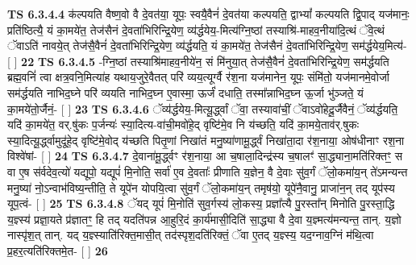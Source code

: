 \documentclass[17pt]{extarticle}
\begin{document}
                  \newline
                                \textbf{ TS 6.3.4.4} \newline
                  क॑ल्पयति वैष्ण॒वो वै दे॒वत॑या॒ यूपः॒ स्वयै॒वैनं॑ दे॒वत॑या कल्पयति॒ द्वाभ्यां᳚ कल्पयति द्वि॒पाद् यज॑मानः॒ प्रति॑ष्ठित्यै॒ यं का॒मये॑त॒ तेज॑सैनं दे॒वता॑भिरिन्द्रि॒येण॒ व्य॑र्द्धयेय॒-मित्य॑ग्नि॒ष्ठां तस्याश्रि॑-माहव॒नीया॑दि॒त्थं ॅवे॒त्थं ॅवाऽति॑ नावये॒त् तेज॑सै॒वैनं॑ दे॒वता॑भिरिन्द्रि॒येण॒ व्य॑र्द्धयति॒ यं का॒मये॑त॒ तेज॑सैनं दे॒वता॑भिरिन्द्रि॒येण॒ सम॑र्द्धयेय॒मित्य॑- [  ] \textbf{  22} \newline
                  \newline
                                \textbf{ TS 6.3.4.5} \newline
                  -ग्नि॒ष्ठां तस्याश्रि॑माहव॒नीये॑न॒ सं मि॑नुया॒त् तेज॑सै॒वैनं॑ दे॒वता॑भिरिन्द्रि॒येण॒ सम॑र्द्धयति ब्रह्म॒वनिं॑ त्वा क्षत्र॒वनि॒मित्या॑ह यथाय॒जुरे॒वैतत् परि॑ व्यय॒त्यूर्ग्वै र॑श॒ना यज॑मानेन॒ यूपः॒ संमि॑तो॒ यज॑मानमे॒वोर्जा सम॑र्द्धयति नाभिद॒घ्ने परि॑ व्ययति नाभिद॒घ्न ए॒वास्मा॒ ऊर्जं॑ दधाति॒ तस्मा᳚न्नाभिद॒घ्न ऊ॒र्जा भु॑ञ्जते॒ यं का॒मये॑तो॒र्जैनं॒- [  ] \textbf{  23} \newline
                  \newline
                                \textbf{ TS 6.3.4.6} \newline
                  ॅव्य॑र्द्धयेय॒-मित्यू॒र्द्ध्वां ॅवा॒ तस्यावा॑चीं॒ ॅवाऽवो॑हेदू॒र्जैवैनं॒ ॅव्य॑र्द्धयति॒ यदि॑ का॒मये॑त॒ वर्.षु॑कः प॒र्जन्यः॑ स्या॒दित्य-वा॑ची॒मवो॑हे॒द् वृष्टि॑मे॒व नि य॑च्छति॒ यदि॑ का॒मये॒ताव॑र्.षुकः स्या॒दित्यू॒र्द्ध्वामुदू॑हे॒द् वृष्टि॑मे॒वोद् य॑च्छति पितृ॒णां निखा॑तं मनु॒ष्या॑णामू॒र्द्ध्वं निखा॑ता॒दा र॑श॒नाया॒ ओष॑धीनाꣳ रश॒ना विश्वे॑षां- [  ] \textbf{  24} \newline
                  \newline
                                \textbf{ TS 6.3.4.7} \newline
                  दे॒वाना॑मू॒र्द्ध्वꣳ र॑श॒नाया॒ आ च॒षाला॒दिन्द्र॑स्य च॒षालꣳ॑ सा॒द्ध्याना॒मति॑रिक्तꣳ॒॒ स वा ए॒ष स॑र्वदेव॒त्यो॑ यद्यूपो॒ यद्यूपं॑ मि॒नोति॒ सर्वा॑ ए॒व दे॒वताः᳚ प्रीणाति य॒ज्ञेन॒ वै दे॒वाः सु॑व॒र्गं ॅलो॒कमा॑य॒न् ते॑ऽमन्यन्त मनु॒ष्या॑ नो॒ऽन्वाभ॑विष्य॒न्तीति॒ ते यूपे॑न योपयि॒त्वा सु॑व॒र्गं ॅलो॒कमा॑य॒न् तमृष॑यो॒ यूपे॑नै॒वानु॒ प्राजा॑न॒न् तद् यूप॑स्य यूप॒त्वं- [  ] \textbf{  25} \newline
                  \newline
                                \textbf{ TS 6.3.4.8} \newline
                  ॅयद् यूपं॑ मि॒नोति॑ सुव॒र्गस्य॑ लो॒कस्य॒ प्रज्ञा᳚त्यै पु॒रस्ता᳚न् मिनोति पु॒रस्ता॒द्धि य॒ज्ञ्स्य॑ प्रज्ञा॒यते प्र॑ज्ञातꣳ॒॒ हि तद् यदति॑पन्न आ॒हुरि॒दं का॒र्य॑मासी॒दिति॑ सा॒द्ध्या वै दे॒वा य॒ज्ञ्मत्य॑मन्यन्त॒ तान्. य॒ज्ञो नास्पृ॑श॒त् तान्. यद् य॒ज्ञ्स्याति॑रिक्त॒मासी॒त् तद॑स्पृश॒दति॑रिक्तं॒ ॅवा ए॒तद् य॒ज्ञ्स्य॒ यद॒ग्नाव॒ग्निं म॑थि॒त्वा प्र॒हर॒त्यति॑रिक्तमे॒त- [  ] \textbf{  26} \newline
\end{document}
